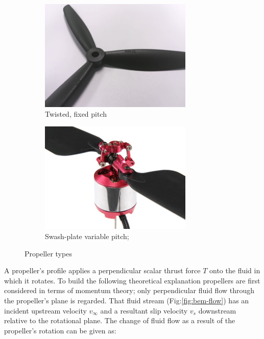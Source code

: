 \begin{figure}[htbp]
\vspace{-8pt}
\centering
\begin{subfigure}{0.49\textwidth}
\centering
\includegraphics[width=0.8\textwidth]{figs/fixed-pitch}
\vspace{-4pt}
\caption{Twisted, fixed pitch}
\label{fig:fixed-pitch}
\end{subfigure}
\begin{subfigure}{0.49\textwidth}
\centering
\includegraphics[width=0.8\textwidth]{figs/variable-pitch}
\vspace{-4pt}
\caption{Swash-plate variable pitch; \cite{variablepitch}}
\label{fig:variable-pitch}
\end{subfigure}
\vspace{-10pt}
\caption{Propeller types}
\label{fig:props}
\vspace{-18pt}
\end{figure}
\par
A propeller's profile applies a perpendicular scalar thrust force $T$ onto the fluid in which it rotates. To build the following theoretical explanation propellers are first considered in terms of momentum theory; only perpendicular fluid flow through the propeller's plane is regarded. That fluid stream (Fig:\ref{fig:bem-flow}) has an incident upstream velocity $v_\infty$ and a resultant slip velocity $v_s$ downstream relative to the rotational plane. The change of fluid flow as a result of the propeller's rotation can be given as:
